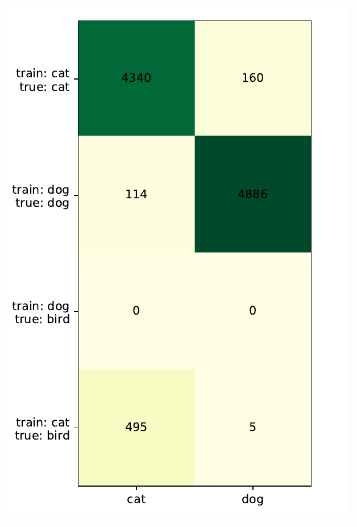 \documentclass[a4paper,11pt]{scrartcl}
\theoremstyle{definition}
\begin{document}
\begin{figure}[htbp]
\centering
\begin{subfigure}[t]{0.49\textwidth}
\includegraphics[width=0.99\textwidth]{Plots_4/compound_1000_10_00_no_Title_same_scale_hidden.pdf}
\label{subfig:confusion_10_00_hidden}
\end{subfigure}
\begin{subfigure}[t]{0.49\textwidth}

\end{subfigure}
\end{figure}
\end{document}

